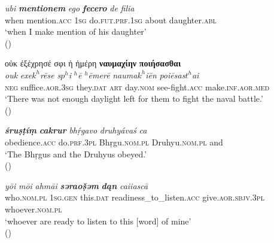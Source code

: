 \documentclass[output=paper,colorlinks,citecolor=brown]{langscibook}
\begin{document}
\ea\label{OldLatin}
\settowidth {}
\gll \textit{ubi}    \textit{\textbf{mentionem}}  \textit{ego}   \textit{\textbf{fecero}}  \textit{de}  \textit{filia}\\
when     mention.\textsc{acc}    \textsc{1sg}    do.\textsc{fut}.\textsc{prf}.\textsc{1sg}   about     daughter.\textsc{abl}\\ 
\glt `when I make mention of his daughter' \\
\hspace*{\fill}()
\z


\ea
\settowidth {}
\glll οὐκ	ἐξέχρησέ		σφι 		ἡ 	ἡμέρη 		\textbf{ναυμαχίην}    \textbf{ποιήσασθαι} \\ \textit{ouk}   \textit{exe$k^h$rēse}     \textit{s$p^h$i}    \textit{$^h$ē}    \textit{$^h$ēmerē}    \textit{nauma$k^h$iēn} \textit{poiēsas$t^h$ai} \\
\textsc{neg}     suffice.\textsc{aor}.\textsc{3sg}    they.\textsc{dat}  \textsc{art}  day.\textsc{nom}   see-fight.\textsc{acc} 
   make.\textsc{inf}.\textsc{aor}.\textsc{med}\\ 
\glt `There was not enough daylight left for them to fight the naval battle.' \\
\hspace*{\fill}()
\z

\ea
\settowidth {}
\gll \textit{\textbf{śruṣṭíṃ}}		\textit{\textbf{cakrur}}		\textit{bhṛ́gavo}		\textit{druhyávaś}		\textit{ca}\\
obedience.\textsc{acc}   do.\textsc{prf}.\textsc{3pl}   Bhṛgu.\textsc{nom}.\textsc{pl}     Druhyu.\textsc{nom}.\textsc{pl}   and\\ 
\glt `The Bhṛgus and the Druhyus obeyed.' \\ 
\hspace*{\fill}()
\z


\ea
\settowidth {}
\gll \textit{yōi}		\textit{mōi}		\textit{ahmāi}		\textit{\textbf{səraoṣ̌əm}}   \textit{\textbf{dąn}}			\textit{caiiascā}\\
who.\textsc{nom}.\textsc{pl}   \textsc{1sg}.\textsc{gen}   this.\textsc{dat}     readiness\_to\_listen.\textsc{acc}    give.\textsc{aor}.\textsc{sbjv}.\textsc{3pl}     whoever.\textsc{nom}.\textsc{pl}\\ 
\glt `whoever are ready to listen to this [word] of mine' \\ 
\hspace*{\fill}()
\z
\end{document}
